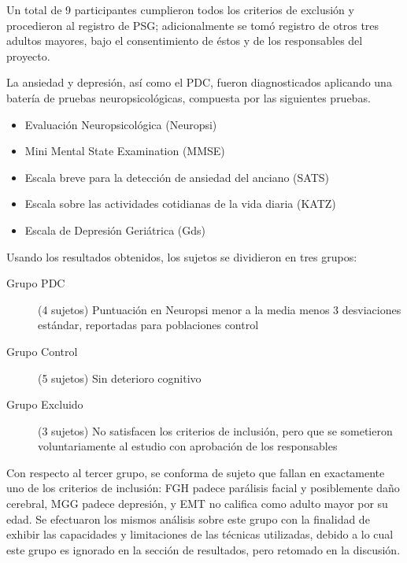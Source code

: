 Un total de 9 participantes cumplieron todos los criterios de exclusi\'on y procedieron al registro 
de PSG; adicionalmente se tom\'o registro de otros tres adultos mayores, bajo
el consentimiento de \'estos y de los responsables del proyecto.

La ansiedad y depresi\'on, as\'i como el PDC, fueron diagnosticados aplicando una bater\'ia de
pruebas neuropsicol\'ogicas, compuesta por las siguientes pruebas. 

\begin{itemize}
\item {Evaluaci\'on Neuropsicol\'ogica (Neuropsi)} \cite{Solis03}
\item {Mini Mental State Examination (MMSE)} \cite{Velasco15}
\item {Escala breve para la detecci\'on de ansiedad del anciano (SATS)} \cite{Vargas11}
\item {Escala sobre las actividades cotidianas de la vida diaria (KATZ)} \cite{Roumec14}
\item {Escala de Depresi\'on Geri\'atrica (Gds)} \cite{Greenberg12,Cuijpers13}
\end{itemize}

Usando los resultados obtenidos, los sujetos se dividieron en tres grupos:
\begin{description}
\item[Grupo PDC] (4 sujetos) Puntuaci\'on en Neuropsi menor a la media menos 3 desviaciones 
est\'andar, reportadas para poblaciones control \cite{Solis03}
\item[Grupo Control] (5 sujetos) Sin deterioro cognitivo
\item[Grupo Excluido] (3 sujetos) No satisfacen los criterios de inclusi\'on, pero que se 
sometieron voluntariamente al estudio con aprobaci\'on de los responsables
\end{description}

Con respecto al tercer grupo, se conforma de sujeto que fallan en exactamente uno de los criterios 
de inclusi\'on: FGH padece par\'alisis facial y posiblemente da\~no cerebral, MGG padece 
depresi\'on, y EMT no califica como adulto mayor por su edad.
Se efectuaron los mismos an\'alisis sobre este grupo con la finalidad de exhibir las capacidades y
limitaciones de las t\'ecnicas utilizadas, debido a lo cual este grupo es ignorado en la secci\'on 
de resultados, pero retomado en la discusi\'on.

